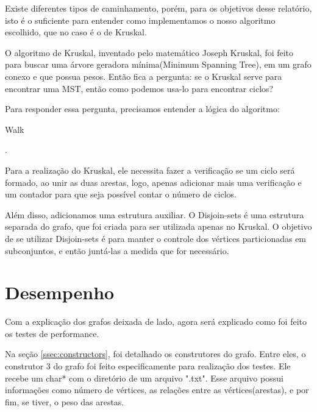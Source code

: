 \documentclass[12pt]{article}
\begin{document}
  Existe diferentes tipos de caminhamento, porém, para os objetivos desse relatório, isto 
  é o suficiente para entender como implementamos o nosso algoritmo escolhido, que no caso 
  é o de Kruskal.

  O algoritmo de Kruskal, inventado pelo matemático Joseph Kruskal, foi feito para buscar 
  uma árvore geradora mínima(Minimum Spanning Tree), em um grafo conexo e que possua pesos. 
  Então fica a pergunta: se o Kruskal serve para encontrar uma MST, então como podemos usa-lo 
  para encontrar ciclos? 

  Para responder essa pergunta, precisamos entender a lógica do algoritmo:

  \begin{algorithm}
    \caption{Walk} \label{euclid2}
    \begin{algorithmic}[1]
    \EndFor
    .
    \EndIf
    \EndWhile
    \EndProcedure
    \end{algorithmic}
  \end{algorithm}

  Para a realização do Kruskal, ele necessita fazer a verificação se um ciclo será formado,
  ao unir as duas arestas, logo, apenas adicionar mais uma verificação e um contador para 
  que seja possível contar o número de ciclos.

  Além disso, adicionamos uma estrutura auxiliar. O Disjoin-sets é uma estrutura separada do grafo,
  que foi criada para ser utilizada apenas no Kruskal. O objetivo de se utilizar Disjoin-sets é para 
  manter o controle dos vértices particionadas em subconjuntos, e então juntá-las a medida que for necessário.

  \section{Desempenho} \label{sec:performance}

  Com a explicação dos grafos deixada de lado, agora será explicado como foi feito os testes de performance.

  Na seção \ref{ssec:constructors}, foi detalhado os construtores do grafo. Entre eles,
  o construtor 3 do grafo foi feito especificamente para realização dos testes. Ele 
  recebe um char* com o diretório de um arquivo ".txt". Esse arquivo possui informações como número de 
  vértices, as relações entre as vértices(arestas), e por fim, se tiver, o peso das arestas.
\end{document}
